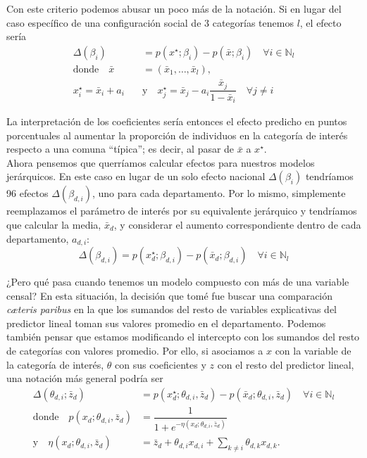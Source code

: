 Con este criterio podemos abusar un poco más de la notación. Si en lugar del caso específico de una configuración social de 3 categorías tenemos $l$, el efecto sería 
\begin{align*}
\Delta(\beta_i) &= p(x^\star;\beta_i)-p(\bar{x};\beta_i) \quad \forall i \in \mathbb{N}_l \\
\text{donde} \quad \bar{x} &= (\bar{x}_1,\dots,\bar{x}_{l}), \\ 
x_i^\star = \bar{x}_i + a_i \quad &\text{y} \quad x_j^\star =\bar{x}_j - a_i\dfrac{\bar{x}_j}{1- \bar{x}_i} \quad \forall j \neq i 
\end{align*}

La interpretación de los coeficientes sería entonces el efecto predicho en puntos porcentuales al aumentar la proporción de individuos en la categoría de interés respecto a una comuna ``típica''; es decir, al pasar de $\bar{x}$ a $x^\star$.\\ 

Ahora pensemos que querríamos calcular efectos para nuestros modelos jerárquicos. En este caso en lugar de un solo efecto nacional $\Delta(\beta_i)$ tendríamos 96 efectos $\Delta(\beta_{d,i})$, uno para cada departamento. Por lo mismo, simplemente reemplazamos el parámetro de interés por su equivalente jerárquico y tendríamos que calcular la media, $\bar{x}_{d}$, y considerar el aumento correspondiente dentro de cada departamento, $a_{d,i}$: 
\begin{equation*}
\Delta(\beta_{d,i}) =  p(x^\star_{d};\beta_{d,i})-p(\bar{x}_{d};\beta_{d,i}) \quad \forall i \in \mathbb{N}_l
\end{equation*}

¿Pero qué pasa cuando tenemos un modelo compuesto con más de una variable censal? En esta situación, la decisión que tomé fue buscar una comparación \textit{c\ae teris paribus} en la que los sumandos del resto de variables explicativas del predictor lineal toman sus valores promedio en el departamento. Podemos también pensar que estamos modificando el intercepto con los sumandos del resto de categorías con valores promedio. Por ello, si asociamos a $x$ con la variable de la categoría de interés, $\theta$ con sus coeficientes y $z$ con el resto del predictor lineal, una notación más general podría ser
\begin{align}\label{eq:Efecto_Enchufado_Compuesto}
\Delta(\theta_{d,i};\bar{z}_d) &= p(x_d^\star;\theta_{d,i},\bar{z}_d)-p(\bar{x}_d;\theta_{d,i},\bar{z}_d) \quad \forall i \in \mathbb{N}_l \\
\text{donde} \quad p(x_d;\theta_{d,i},\bar{z}_d) &=\dfrac{1}{1+e^{-\eta(x_d;\theta_{d,i},\bar{z}_d)}} \nonumber \\
\text{y} \quad \eta(x_d;\theta_{d,i},\bar{z}_d) &= \bar{z}_d + \theta_{d,i}x_{d,i} + \sum\limits_{k\neq i} \theta_{d,k}x_{d,k}. \nonumber
\end{align}

